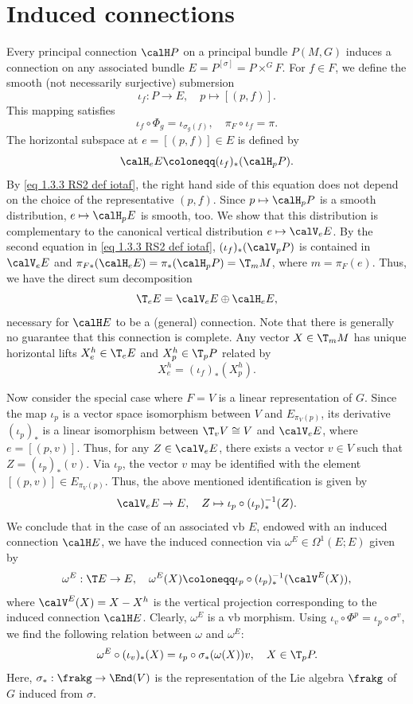 \section{Induced connections}\label{sec: induced connections}


Every principal connection $\calH P$ on a principal bundle $P(M,G)$ induces a connection on any associated bundle $E=P^{[\sigma]}=P\times^G F$. For $f\in F$, we define the smooth (not necessarily surjective) submersion
\[\iota_f:P\to E,\quad p\mapsto [(p,f)].\label{eq 1.3.3 RS2 def iotaf}\]
This mapping satisfies 
\[\iota_f\circ \Phi_g=\iota_{\sigma_g(f)},\quad \pi_F\circ\iota_f=\pi.\]
The horizontal subspace at $e=[(p,f)]\in E$ is defined by
\[\calH_eE\coloneqq (\iota_f)_\ast (\calH_pP).\label{eq 1.3.4 RS2}\]
By \eqref{eq 1.3.3 RS2 def iotaf}, the right hand side of this equation does not depend on the choice of the representative $(p,f)$. Since $p\mapsto \calH_pP$ is a smooth distribution, $e\mapsto \calH_pE$ is smooth, too. We show that this distribution is complementary to the canonical vertical distribution $e\mapsto \calV_eE$. By the second equation in \eqref{eq 1.3.3 RS2 def iotaf}, $(\iota_f)_\ast(\calV_pP)$ is contained in $\calV_eE$ and $\pi_{F\ast}(\calH_eE)=\pi_\ast(\calH_pP)=\T_mM$, where $m=\pi_F(e)$. Thus, we have the direct sum decomposition 
\[\T_eE=\calV_eE\oplus \calH_eE,\]
necessary for $\calH E$ to be a (general) connection. Note that there is generally no guarantee that this connection is complete. Any vector $X\in \T_mM$ has unique horizontal lifts $X_e^h\in \T_eE$ and $X_p^h\in \T_pP$ related by
\[X^h_e=(\iota_f)_\ast(X^h_p).\label{eq 1.3.5 RS2}\]

Now consider the special case where $F=V$ is a linear representation of $G$. Since the map $\iota_p$ is a vector space isomorphism between $V$ and $E_{\pi_V(p)}$, its derivative $(\iota_p)_\ast$ is a linear isomorphism between $\T_vV\cong V$ and $\calV_eE$, where $e=[(p,v)]$. Thus, for any $Z\in \calV_eE$, there exists a vector $v\in V$ such that $Z=(\iota_p)_\ast(v)$. Via $\iota_p$, the vector $v$ may  be identified with the element $[(p,v)]\in E_{\pi_V(p)}$. Thus, the above mentioned identification is given by 
\[\calV_eE\to E,\quad Z\mapsto \iota_p\circ (\iota_p)_\ast^{-1}(Z).\]
We conclude that in the case of an associated \gls{vb} $E$, endowed with an induced connection $\calH E$, we have the induced connection via $\omega^E\in\Omega^1(E;E)$ given by
\[\omega^E:\T E\to E,\quad \omega^E(X)\coloneqq \iota_p\circ (\iota_p)_\ast^{-1}(\calV^E(X)),\label{eq 1.3.9 RS2}\]
where $\calV^E(X)=X-X^h$ is the vertical projection corresponding to the induced connection $\calH E$. Clearly, $\omega^E$ is a \gls{vb} morphism. Using $\iota_v\circ \Phi^p=\iota_p\circ\sigma^v$, we find the following relation between $\omega$ and $\omega^E$:
\[\omega^E\circ (\iota_v)_\ast(X)=\iota_p\circ \sigma_{\ast}(\omega(X))v,\quad X\in \T_pP.\]
Here, $\sigma_{\ast}:\frakg\to \End(V)$ is the representation of the Lie algebra $\frakg$ of $G$ induced from $\sigma$.

